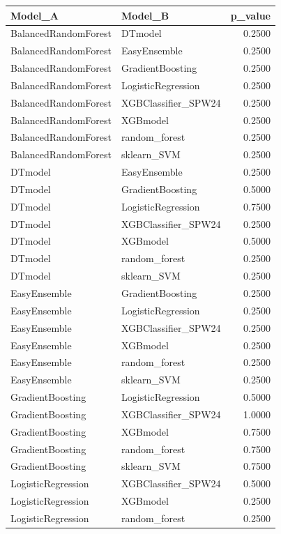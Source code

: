 \begin{table}[t]
\centering
\begin{tabular}{llr}
\toprule
Model_A & Model_B & p_value \\
\midrule
BalancedRandomForest & DTmodel & 0.2500 \\
BalancedRandomForest & EasyEnsemble & 0.2500 \\
BalancedRandomForest & GradientBoosting & 0.2500 \\
BalancedRandomForest & LogisticRegression & 0.2500 \\
BalancedRandomForest & XGBClassifier_SPW24 & 0.2500 \\
BalancedRandomForest & XGBmodel & 0.2500 \\
BalancedRandomForest & random_forest & 0.2500 \\
BalancedRandomForest & sklearn_SVM & 0.2500 \\
DTmodel & EasyEnsemble & 0.2500 \\
DTmodel & GradientBoosting & 0.5000 \\
DTmodel & LogisticRegression & 0.7500 \\
DTmodel & XGBClassifier_SPW24 & 0.2500 \\
DTmodel & XGBmodel & 0.5000 \\
DTmodel & random_forest & 0.2500 \\
DTmodel & sklearn_SVM & 0.2500 \\
EasyEnsemble & GradientBoosting & 0.2500 \\
EasyEnsemble & LogisticRegression & 0.2500 \\
EasyEnsemble & XGBClassifier_SPW24 & 0.2500 \\
EasyEnsemble & XGBmodel & 0.2500 \\
EasyEnsemble & random_forest & 0.2500 \\
EasyEnsemble & sklearn_SVM & 0.2500 \\
GradientBoosting & LogisticRegression & 0.5000 \\
GradientBoosting & XGBClassifier_SPW24 & 1.0000 \\
GradientBoosting & XGBmodel & 0.7500 \\
GradientBoosting & random_forest & 0.7500 \\
GradientBoosting & sklearn_SVM & 0.7500 \\
LogisticRegression & XGBClassifier_SPW24 & 0.5000 \\
LogisticRegression & XGBmodel & 0.2500 \\
LogisticRegression & random_forest & 0.2500 \\

\end{tabular}
\end{table}
